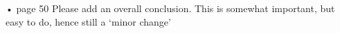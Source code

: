 





• page 50  Please add an overall conclusion. This is somewhat important, but easy to do, hence still a ‘minor change’








